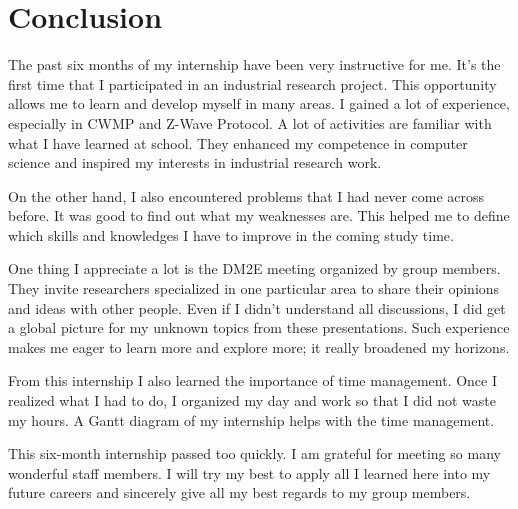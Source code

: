 
\chapter{Conclusion} %

\label{Chapter7} %



The past six months of my internship have been very instructive for me. It's the first time that I participated in an industrial research project. This opportunity allows me to learn and develop myself in many areas. I gained a lot of experience, especially in CWMP and Z-Wave Protocol. A lot of activities are familiar with what I have learned at school. They enhanced my competence in computer science and inspired my interests in industrial research work.

On the other hand, I also encountered problems that I had never come across before. It was good to find out what my weaknesses are. This helped me to define which skills and knowledges I have to improve in the coming study time.

One thing I appreciate a lot is the DM2E meeting organized by group members. They invite researchers specialized in one particular area to share their opinions and ideas with other people. Even if I didn't understand all discussions, I did get a global picture for my unknown topics from these presentations. Such experience makes me eager to learn more and explore more; it really broadened my horizons.

From this internship I also learned the importance of time management. Once I realized what I had to do, I organized my day and work so that I did not waste my hours. A Gantt diagram of my internship helps with the time management.

This six-month internship passed too quickly. I am grateful for meeting so many wonderful staff members. I will try my best to apply all I learned here into my future careers and sincerely give all my best regards to my group members.
